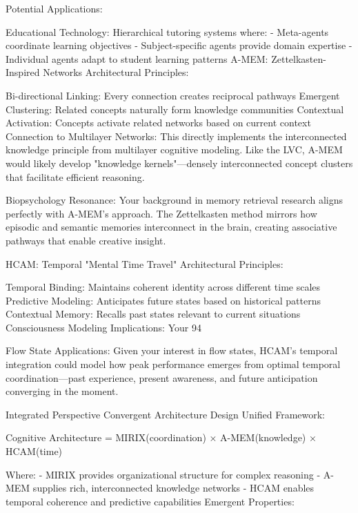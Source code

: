 Potential Applications:

Educational Technology: Hierarchical tutoring systems where:
- Meta-agents coordinate learning objectives
- Subject-specific agents provide domain expertise
- Individual agents adapt to student learning patterns
A-MEM: Zettelkasten-Inspired Networks
Architectural Principles:

Bi-directional Linking: Every connection creates reciprocal pathways
Emergent Clustering: Related concepts naturally form knowledge communities
Contextual Activation: Concepts activate related networks based on current context
Connection to Multilayer Networks: This directly implements the interconnected knowledge principle from multilayer cognitive modeling. Like the LVC, A-MEM would likely develop "knowledge kernels"—densely interconnected concept clusters that facilitate efficient reasoning.

Biopsychology Resonance: Your background in memory retrieval research aligns perfectly with A-MEM's approach. The Zettelkasten method mirrors how episodic and semantic memories interconnect in the brain, creating associative pathways that enable creative insight.

HCAM: Temporal "Mental Time Travel"
Architectural Principles:

Temporal Binding: Maintains coherent identity across different time scales
Predictive Modeling: Anticipates future states based on historical patterns
Contextual Memory: Recalls past states relevant to current situations
Consciousness Modeling Implications: Your 94%

Flow State Applications: Given your interest in flow states, HCAM's temporal integration could model how peak performance emerges from optimal temporal coordination—past experience, present awareness, and future anticipation converging in the moment.

Integrated Perspective
Convergent Architecture Design
Unified Framework:

Cognitive Architecture = MIRIX(coordination) × A-MEM(knowledge) × HCAM(time)

Where:
- MIRIX provides organizational structure for complex reasoning
- A-MEM supplies rich, interconnected knowledge networks
- HCAM enables temporal coherence and predictive capabilities
Emergent Properties:

